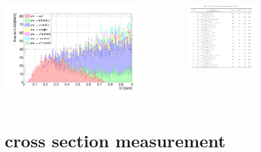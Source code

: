 \documentclass[aspectratio=169]{ctexbeamer}
\begin{document}
\begin{frame}
  \begin{columns}
    \begin{column}{0.5\textwidth}
      \centering
      \includegraphics[width=0.8\textwidth]{figures/bkg_sqrts.png}
    \end{column}
    \begin{column}{0.5\textwidth}
      \centering
      \includegraphics[width=0.6\textwidth]{figures/topo.png}
    \end{column}
  \end{columns}
\end{frame}

\section{cross section measurement}
\end{document}
